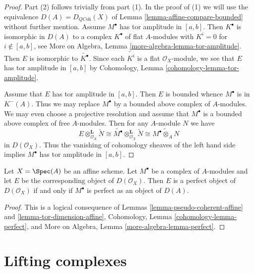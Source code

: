 \begin{proof}
Part (2) follows trivially from part (1). In the proof of (1) we will
use the equivalence $D(A) = D_{\textit{QCoh}}(X)$ of
Lemma \ref{lemma-affine-compare-bounded}
without further mention.
Assume $M^\bullet$ has tor amplitude in $[a, b]$. Then $K^\bullet$
is isomorphic in $D(A)$ to a complex $K^\bullet$ of flat $A$-modules
with $K^i = 0$ for $i \not \in [a, b]$, see
More on Algebra, Lemma \ref{more-algebra-lemma-tor-amplitude}.
Then $E$ is isomorphic to $\widetilde{K^\bullet}$. Since each
$\widetilde{K^i}$ is a flat $\mathcal{O}_X$-module, we see
that $E$ has tor amplitude in $[a, b]$ by
Cohomology, Lemma \ref{cohomology-lemma-tor-amplitude}.

\medskip\noindent
Assume that $E$ has tor amplitude in $[a, b]$. Then $E$ is bounded
whence $M^\bullet$ is in $K^-(A)$. Thus we may replace $M^\bullet$
by a bounded above complex of $A$-modules. We may even choose
a projective resolution and assume that $M^\bullet$ is a bounded above
complex of free $A$-modules. Then for any $A$-module $N$ we have
$$
E \otimes_{\mathcal{O}_X}^\mathbf{L} \widetilde{N}
\cong
\widetilde{M^\bullet} \otimes_{\mathcal{O}_X}^\mathbf{L} \widetilde{N}
\cong
\widetilde{M^\bullet \otimes_A N}
$$
in $D(\mathcal{O}_X)$. Thus the vanishing of cohomology sheaves of
the left hand side implies $M^\bullet$ has tor amplitude in $[a, b]$.
\end{proof}

\begin{lemma}
\label{lemma-perfect-affine}
Let $X = \Spec(A)$ be an affine scheme. Let $M^\bullet$ be a
complex of $A$-modules and let $E$ be the corresponding object
of $D(\mathcal{O}_X)$. Then $E$ is a perfect object of $D(\mathcal{O}_X)$
if and only if $M^\bullet$ is perfect as an object of $D(A)$.
\end{lemma}

\begin{proof}
This is a logical consequence of
Lemmas \ref{lemma-pseudo-coherent-affine} and
\ref{lemma-tor-dimension-affine},
Cohomology, Lemma \ref{cohomology-lemma-perfect}, and
More on Algebra, Lemma \ref{more-algebra-lemma-perfect}.
\end{proof}





\section{Lifting complexes}
\label{section-lift}

